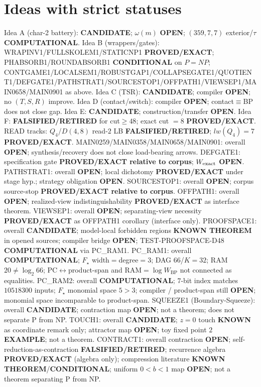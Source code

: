 \documentclass[11pt]{article}
\begin{document}
\section*{Ideas with strict statuses}
Idea A (char-2 battery): \textbf{CANDIDATE}; $\omega(m)$ \textbf{OPEN}; $(359,7,7)$ exterior/$\tau$ \textbf{COMPUTATIONAL}.
Idea B (wrappers/gates): WRAPINV1/FULLSKOLEM1/STATICNP1 \textbf{PROVED/EXACT};
PHABSORB1/ROUNDABSORB1 \textbf{CONDITIONAL} on $P=NP$;
CONTGAME1/LOCALSEM1/ROBUSTGAP1/COLLAPSEGATE1/QUOTIENT1/DEFGATE1/PATHSTRAT1/SOURCESTOP1/OFFPATH1/VIEWSEP1/MAIN0658/MAIN0901 as above.
Idea C (TSR): \textbf{CANDIDATE}; compiler \textbf{OPEN}; no $(T,S,R)$ improve.
Idea D (contact/switch): compiler \textbf{OPEN}; contact$\equiv$BP does not close gap.
Idea E: \textbf{CANDIDATE}; construction/transfer \textbf{OPEN}.
Idea F: \textbf{FALSIFIED/RETIRED} for cut$\ge48$; exact cut $=8$ \textbf{PROVED/EXACT}.
READ tracks: $Q_4$/$D(4,8)$ read-$2$ LB \textbf{FALSIFIED/RETIRED}; $lw(Q_4)=7$ \textbf{PROVED/EXACT}.
MAIN0259/MAIN0358/MAIN0658/MAIN0901: overall \textbf{OPEN}; synthesis/recovery does not close load-bearing arrows.
DEFGATE1: specification gate \textbf{PROVED/EXACT relative to corpus}; $W_{\rm exact}$ \textbf{OPEN}.
PATHSTRAT1: overall \textbf{OPEN}; local dichotomy \textbf{PROVED/EXACT} under stage hyp.; strategy obligation \textbf{OPEN}.
SOURCESTOP1: overall \textbf{OPEN}; corpus source-stop \textbf{PROVED/EXACT relative to corpus}.
OFFPATH1: overall \textbf{OPEN}; realized-view indistinguishability \textbf{PROVED/EXACT} as interface theorem.
VIEWSEP1: overall \textbf{OPEN}; separating-view necessity \textbf{PROVED/EXACT} as OFFPATH1 corollary (interface only).
PROOFSPACE1: overall \textbf{CANDIDATE}; model-local forbidden regions \textbf{KNOWN THEOREM} in opened sources;
compiler bridge \textbf{OPEN}; TEST-PROOFSPACE-D48 \textbf{COMPUTATIONAL} via PC\_RAM1.
PC\_RAM1: overall \textbf{COMPUTATIONAL}; $F_\star$ width$=$degree$=3$; DAG $66$/$K{=}32$; RAM $20\neq\log_2 66$;
PC$\leftrightarrow$product-span and RAM$=\log W_{\mathrm{BP}}$ not connected as equalities.
PC\_RAM2: overall \textbf{COMPUTATIONAL}; $7$-bit index matches $10518300$ inputs; $F_\star$ monomial space $5{>}3$;
compiler / product-span still \textbf{OPEN}; monomial space incomparable to product-span.
SQUEEZE1 (Boundary-Squeeze): overall \textbf{CANDIDATE}; contraction map \textbf{OPEN}; not a theorem;
does not separate P from NP.
TOUCH1: overall \textbf{CANDIDATE}; $z{=}0$ touch \textbf{KNOWN} as coordinate remark only; attractor map \textbf{OPEN}; toy fixed point $2$ \textbf{EXAMPLE}; not a theorem.
CONTRACT1: overall contraction \textbf{OPEN}; self-reduction-as-contraction \textbf{FALSIFIED/RETIRED};
recurrence algebra \textbf{PROVED/EXACT} (algebra only); compression literature \textbf{KNOWN THEOREM}/\textbf{CONDITIONAL};
uniform $0{<}b{<}1$ map \textbf{OPEN}; not a theorem separating P from NP.
\end{document}
